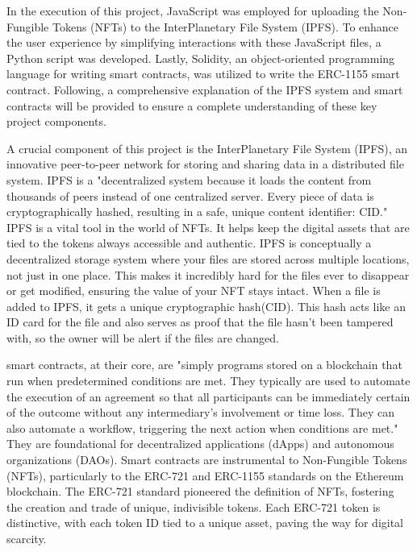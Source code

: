 \documentclass[10pt,twocolumn]{article}
\begin{document}
In the execution of this project, JavaScript was employed for uploading the Non-Fungible Tokens (NFTs) to the InterPlanetary File System (IPFS). To enhance the user experience by simplifying interactions with these JavaScript files, a Python script was developed. Lastly, Solidity, an object-oriented programming language for writing smart contracts, was utilized to write the ERC-1155 smart contract. Following, a comprehensive explanation of the IPFS system and smart contracts will be provided to ensure a complete understanding of these key project components. 

A crucial component of this project is the InterPlanetary File System (IPFS), an innovative peer-to-peer network for storing and sharing data in a distributed file system.  IPFS is a "decentralized system because it loads the content from thousands of peers instead of one centralized server. Every piece of data is cryptographically hashed, resulting in a safe, unique content identifier: CID." IPFS is a vital tool in the world of NFTs. It helps keep the digital assets that are tied to the tokens always accessible and authentic. IPFS is conceptually a decentralized storage system where your files are stored across multiple locations, not just in one place. This makes it incredibly hard for the files ever to disappear or get modified, ensuring the value of your NFT stays intact. When a file is added to IPFS, it gets a unique cryptographic hash(CID). This hash acts like an ID card for the file and also serves as proof that the file hasn't been tampered with, so the owner will be alert if the files are changed.

smart contracts, at their core, are "simply programs stored on a blockchain that run when predetermined conditions are met. They typically are used to automate the execution of an agreement so that all participants can be immediately certain of the outcome without any intermediary’s involvement or time loss. They can also automate a workflow, triggering the next action when conditions are met."\cite{IBMSmartcontractt} They are foundational for decentralized applications (dApps) and autonomous organizations (DAOs). Smart contracts are instrumental to Non-Fungible Tokens (NFTs), particularly to the ERC-721 and ERC-1155 standards on the Ethereum blockchain. The ERC-721 standard pioneered the definition of NFTs, fostering the creation and trade of unique, indivisible tokens. Each ERC-721 token is distinctive, with each token ID tied to a unique asset, paving the way for digital scarcity.
\end{document}
